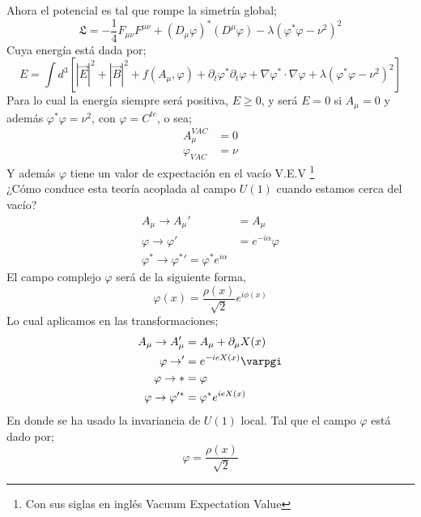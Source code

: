 \documentclass[../main.tex]{subfiles}
\begin{document}
 Ahora el potencial es tal que rompe la simetría global;
 \begin{equation}
   \mathfrak{L} = -\frac{1}{4} F_{\mu\nu}F^{\mu\nu} + \left( D_\mu\varphi \right)^* \left( D^\mu \varphi \right) - \lambda \left( \varphi^* \varphi-\nu^2 \right)^2
  \end{equation}
  Cuya energía está dada por;
  \begin{equation}
    E = \int d^3 \left[ |\vec{E}|^2 + |\vec{B}|^2 + f(A_\mu,\varphi) + \partial_t \varphi^* \partial_t\varphi  + \nabla \varphi^* \cdot \nabla \varphi + \lambda \left( \varphi^* \varphi - \nu^2 \right)^2\right]
   \end{equation}
   Para lo cual la energía siempre será positiva, $E\geq 0$, y será $E=0$ si $A_\mu=0$  y además $\varphi^*\varphi=\nu^2$, con $\varphi=C^{te}$, o sea;
   \begin{align*}
     A^{VAC}_\mu & = 0\\
     \varphi_{VAC} & = \nu
  \end{align*}
  Y además $\varphi$ tiene un valor de expectación en el vacío V.E.V \footnote{Con sus siglas en inglés Vacuum Expectation Value} \\
  ¿Cómo conduce esta teoría acoplada al campo $U(1)$ cuando estamos cerca del vacío? 
  \begin{align*}
    A_\mu\rightarrow A_\mu'  & = A_\mu  \\
    \varphi \rightarrow \varphi' & = e^{-i\alpha}\varphi \\
    \varphi^*\rightarrow \varphi^*' = \varphi^* e^{i\alpha}
  \end{align*}
  El campo complejo $\varphi$ será de la siguiente forma,
  \begin{equation}
    \varphi(x) = \frac{\rho(x)}{\sqrt{2}} e^{i \phi (x)}
   \end{equation}
  Lo cual aplicamos en las transformaciones;
  \begin{align*}
    A_\mu \rightarrow A_\mu'& = A_\mu + \partial_\mu X(x) \\
    \varphi \rightarrow' &= e^{-ieX(x)}\varpgi \\
    \varphi\rightarrow* &= \varphi \\
    \varphi \rightarrow \varphi'^*& = \varphi^* e^{ieX(x)}
  \end{align*}
  En donde se ha usado la invariancia de $U(1)$ local. Tal que el campo $\varphi$ está dado por;
  \begin{equation}
    \varphi = \frac{\rho(x)}{\sqrt{2}}
   \end{equation}
\end{document}
